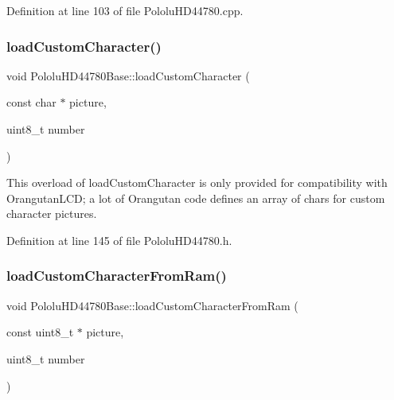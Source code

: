 Definition at line 103 of file Pololu\+H\+D44780.\+cpp.

\mbox{\label{class_pololu_h_d44780_base_a4f22d613433fce0e0c661a237ade9aeb}} 
\subsubsection{\texorpdfstring{load\+Custom\+Character()}{loadCustomCharacter()}\hspace{0.1cm}{\footnotesize\ttfamily [2/2]}}
{\footnotesize\ttfamily void Pololu\+H\+D44780\+Base\+::load\+Custom\+Character (\begin{DoxyParamCaption}\item[{const char $\ast$}]{picture,  }\item[{uint8\+\_\+t}]{number }\end{DoxyParamCaption})\hspace{0.3cm}{\ttfamily [inline]}}

This overload of load\+Custom\+Character is only provided for compatibility with Orangutan\+L\+CD; a lot of Orangutan code defines an array of chars for custom character pictures. 

Definition at line 145 of file Pololu\+H\+D44780.\+h.

\mbox{\label{class_pololu_h_d44780_base_a72674b5466690b49b639ae2ec3e4983f}} 
\subsubsection{\texorpdfstring{load\+Custom\+Character\+From\+Ram()}{loadCustomCharacterFromRam()}}
{\footnotesize\ttfamily void Pololu\+H\+D44780\+Base\+::load\+Custom\+Character\+From\+Ram (\begin{DoxyParamCaption}\item[{const uint8\+\_\+t $\ast$}]{picture,  }\item[{uint8\+\_\+t}]{number }\end{DoxyParamCaption})}

